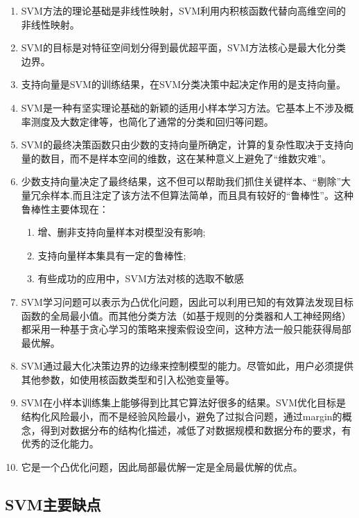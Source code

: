 \begin{enumerate}\itemsep0em
		\item  SVM方法的理论基础是非线性映射，SVM利用内积核函数代替向高维空间的非线性映射。
		\item  SVM的目标是对特征空间划分得到最优超平面，SVM方法核心是最大化分类边界。
		\item  支持向量是SVM的训练结果，在SVM分类决策中起决定作用的是支持向量。
		\item  SVM是一种有坚实理论基础的新颖的适用小样本学习方法。它基本上不涉及概率测度及大数定律等，也简化了通常的分类和回归等问题。
		\item  SVM的最终决策函数只由少数的支持向量所确定，计算的复杂性取决于支持向量的数目，而不是样本空间的维数，这在某种意义上避免了``维数灾难''。
		\item  少数支持向量决定了最终结果，这不但可以帮助我们抓住关键样本、``剔除''大量冗余样本,而且注定了该方法不但算法简单，而且具有较好的``鲁棒性''。这种鲁棒性主要体现在：
		\begin{enumerate}\itemsep0em
				\item 增、删非支持向量样本对模型没有影响;
				\item 支持向量样本集具有一定的鲁棒性;
				\item 有些成功的应用中，SVM方法对核的选取不敏感
		\end{enumerate}

	\item  SVM学习问题可以表示为凸优化问题，因此可以利用已知的有效算法发现目标函数的全局最小值。而其他分类方法（如基于规则的分类器和人工神经网络）都采用一种基于贪心学习的策略来搜索假设空间，这种方法一般只能获得局部最优解。
	\item  SVM通过最大化决策边界的边缘来控制模型的能力。尽管如此，用户必须提供其他参数，如使用核函数类型和引入松弛变量等。

	\item  SVM在小样本训练集上能够得到比其它算法好很多的结果。SVM优化目标是结构化风险最小，而不是经验风险最小，避免了过拟合问题，通过margin的概念，得到对数据分布的结构化描述，减低了对数据规模和数据分布的要求，有优秀的泛化能力。

	\item  它是一个凸优化问题，因此局部最优解一定是全局最优解的优点。
\end{enumerate}

\subsection{SVM主要缺点}

